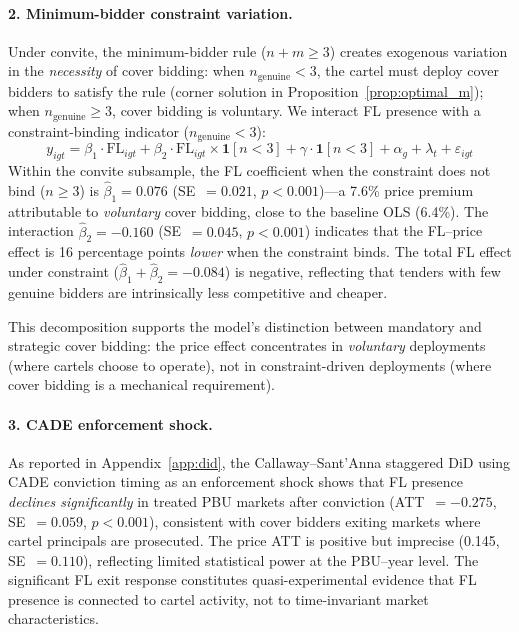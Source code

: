 \paragraph{2. Minimum-bidder constraint variation.}
Under convite, the minimum-bidder rule ($n + m \geq 3$) creates
exogenous variation in the \emph{necessity} of cover bidding: when
$n_{\text{genuine}} < 3$, the cartel must deploy cover bidders to
satisfy the rule (corner solution in
Proposition~\ref{prop:optimal_m}); when $n_{\text{genuine}} \geq 3$,
cover bidding is voluntary. We interact FL presence with a
constraint-binding indicator ($n_{\text{genuine}} < 3$):
\[
  y_{igt} = \beta_1 \cdot \text{FL}_{igt} + \beta_2 \cdot
  \text{FL}_{igt} \times \mathbf{1}[n < 3]
  + \gamma \cdot \mathbf{1}[n < 3] + \alpha_g + \lambda_t +
  \varepsilon_{igt}
\]
Within the convite subsample, the FL coefficient when the constraint
does not bind ($n \geq 3$) is $\hat{\beta}_1 = 0.076$ (SE~$= 0.021$,
$p < 0.001$)---a 7.6\% price premium attributable to \emph{voluntary}
cover bidding, close to the baseline OLS (6.4\%). The interaction
$\hat{\beta}_2 = -0.160$ (SE~$= 0.045$, $p < 0.001$) indicates that
the FL--price effect is 16 percentage points \emph{lower} when the
constraint binds. The total FL effect under constraint
($\hat{\beta}_1 + \hat{\beta}_2 = -0.084$) is negative, reflecting
that tenders with few genuine bidders are intrinsically less
competitive and cheaper.

This decomposition supports the model's distinction between mandatory
and strategic cover bidding: the price effect concentrates in
\emph{voluntary} deployments (where cartels choose to operate), not
in constraint-driven deployments (where cover bidding is a mechanical
requirement).

\paragraph{3. CADE enforcement shock.}
As reported in
Appendix~\ref{app:did}, the Callaway--Sant'Anna staggered DiD
using CADE conviction timing as an enforcement shock shows that FL
presence \emph{declines significantly} in treated PBU markets after
conviction (ATT~$= -0.275$, SE~$= 0.059$, $p < 0.001$), consistent
with cover bidders exiting markets where cartel principals are
prosecuted. The price ATT is positive but imprecise (0.145,
SE~$= 0.110$), reflecting limited statistical power at the
PBU--year level. The significant FL exit response constitutes
quasi-experimental evidence that FL presence is connected to
cartel activity, not to time-invariant market characteristics.
